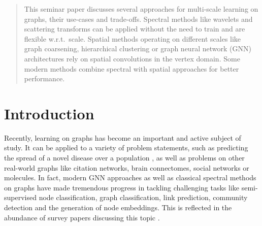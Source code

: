\documentclass{article}
\begin{document}
\printAffiliationsAndNotice{}  %

\begin{abstract}
This seminar paper discusses several approaches for multi-scale learning on graphs, their use-cases and trade-offs. %
 Spectral methods like wavelets and scattering transforms can be applied without the need to train and are flexible w.r.t.\ scale. %
 Spatial methods operating on different scales like graph coarsening, hierarchical clustering or graph neural network (GNN) architectures rely on spatial convolutions in the vertex domain. Some modern methods combine spectral with spatial approaches for better performance. %
\end{abstract}

\section{Introduction}
\label{introduction}
Recently, learning on graphs has become an important and active subject of study. It can be applied to a variety of problem statements, such as predicting the spread of a novel disease over a population \cite{hammond2011wavelets}, as well as problems on other real-world graphs like citation networks, brain connectomes, social networks or molecules. In fact, modern GNN approaches as well as classical spectral methods on graphs have made tremendous progress in tackling challenging tasks like semi-supervised node classification, graph classification, link prediction, community detection and the generation of node embeddings. This is reflected in the abundance of survey papers discussing this topic \cite{ zhang2020deep, zhou2018graph, wu2020comprehensive, ortega2018graph, bronstein2017geometric}.
\end{document}
